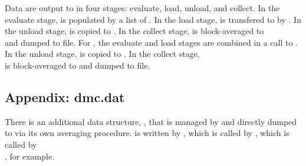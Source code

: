 Data are output to  in four stages: evaluate, load, unload, and collect. In the evaluate stage,  is populated by a list of . In the load stage,  is transfered to  by . In the unload stage,  is copied to . In the collect stage,  is block-averaged to \\  and dumped to file. For , the evaluate and load stages are combined in a call to . In the unload stage,  is copied to . In the collect stage, \\  is block-averaged to  and dumped to file.

\subsection{Appendix: dmc.dat}

\begin{sloppypar}
There is an additional data structure, , that is managed by  and directly dumped to  via its own averaging procedure.  is written by , which is called by , which is called by \\ , for example.
\end{sloppypar}
